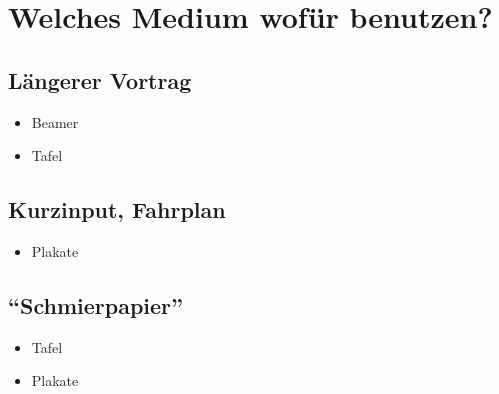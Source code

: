 \section{Welches Medium wofür benutzen?}

\subsection{Längerer Vortrag}
\begin{itemize}
  \item Beamer
  \item Tafel
\end{itemize}

\subsection{Kurzinput, Fahrplan}
\begin{itemize}
  \item Plakate
\end{itemize}

\subsection{"`Schmierpapier"'}
\begin{itemize}
  \item Tafel
  \item Plakate
\end{itemize}
